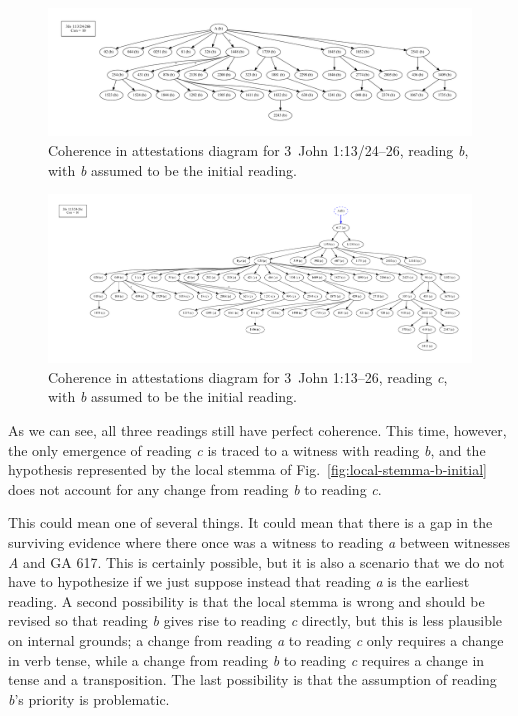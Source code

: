 \documentclass[a4paper, 12pt]{article}
\begin{document}
	\begin{figure}
		\centering
		\includegraphics[scale=0.3333]{../graphics/B25K1V13U24-26Rb-coherence-attestations-2.pdf}
		\caption{Coherence in attestations diagram for 3~John 1:13/24–26, reading \emph{b}, with \emph{b} assumed to be the initial reading.}
		\label{fig:coherence-b-2}
	\end{figure}
	
	\begin{figure}
		\centering
		\includegraphics[scale=0.3333]{../graphics/B25K1V13U24-26Rc-coherence-attestations-2.pdf}
		\caption{Coherence in attestations diagram for 3~John 1:13–26, reading \emph{c}, with \emph{b} assumed to be the initial reading.}
		\label{fig:coherence-c-2}
	\end{figure}
	
	\newpage
	
	As we can see, all three readings still have perfect coherence. This time, however, the only emergence of reading \emph{c} is traced to a witness with reading \emph{b}, and the hypothesis represented by the local stemma of Fig.~\ref{fig:local-stemma-b-initial} does not account for any change from reading \emph{b} to reading \emph{c}.
	
	This could mean one of several things. It could mean that there is a gap in the surviving evidence where there once was a witness to reading \emph{a} between witnesses \emph{A} and GA 617. This is certainly possible, but it is also a scenario that we do not have to hypothesize if we just suppose instead that reading \emph{a} is the earliest reading. A second possibility is that the local stemma is wrong and should be revised so that reading \emph{b} gives rise to reading \emph{c} directly, but this is less plausible on internal grounds; a change from reading \emph{a} to reading \emph{c} only requires a change in verb tense, while a change from reading \emph{b} to reading \emph{c} requires a change in tense and a transposition. The last possibility is that the assumption of reading \emph{b}'s priority is problematic.
	
\end{document}
